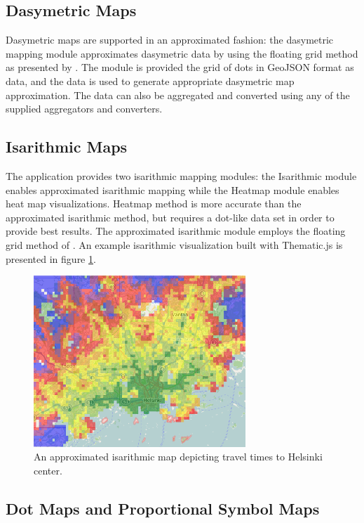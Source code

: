 \subsection{Dasymetric Maps}

Dasymetric maps are supported in an approximated fashion: the dasymetric mapping module approximates dasymetric data by using the floating grid method as presented by \citet{langford_generating_1994}. The module is provided the grid of dots in GeoJSON format as data, and the data is used to generate appropriate dasymetric map approximation. The data can also be aggregated and converted using any of the supplied aggregators and converters.

\subsection{Isarithmic Maps}

The application provides two isarithmic mapping modules: the Isarithmic module enables approximated isarithmic mapping while the Heatmap module enables heat map visualizations. Heatmap method is more accurate than the approximated isarithmic method, but requires a dot-like data set in order to provide best results. The approximated isarithmic module employs the floating grid method of \citet{langford_generating_1994}. An example isarithmic visualization built with Thematic.js is presented in figure \ref{fig:isarithmicimpl}.

\begin{figure}[htbp]
  \begin{center}
    \includegraphics[width=8cm]{images/isarithmic-example.png}
    \caption{An approximated isarithmic map depicting travel times to Helsinki center.}
    \label{fig:isarithmicimpl}
  \end{center}
\end{figure}

\subsection{Dot Maps and Proportional Symbol Maps}

